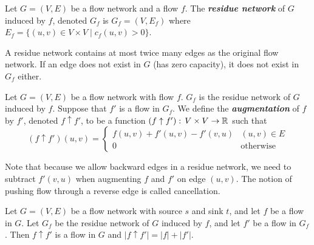 \begin{definition} 
    Let $G=(V,E)$ be a flow network and a flow $f$. The \textit{\textbf{residue network}} of $G$ induced by $f$, denoted $G_f$ is $G_f = (V,E_f)$ where $E_f = \{(u,v) \in V \times V \mid c_f(u,v) > 0 \}$.
\end{definition}
A residue network contains at most twice many edges as the original flow network. If an edge does not exist in $G$ (has zero capacity), it does not exist in $G_f$ either.

\begin{definition}[Augmentation] 
    Let $G=(V,E)$ be a flow network with flow $f$. $G_f$ is the residue network of $G$ induced by $f$. Suppose that $f'$ is a flow in $G_f$. We define the \textit{\textbf{augmentation}} of $f$ by $f'$, denoted $f \uparrow f'$, to be a function $(f \uparrow f'):\, V\times V \to \mathbb{R}$ such that
    $$
    (f \uparrow f')(u,v) = \begin{cases}
        f(u,v) + f'(u,v) - f'(v,u) & (u,v) \in E \\
        0 & \text{otherwise}
    \end{cases}
    $$
\end{definition}

Note that because we allow backward edges in a residue network, we need to subtract $f'(v,u)$ when augmenting $f$ and $f'$ on edge $(u,v)$. The notion of pushing flow through a reverse edge is called cancellation.

\begin{lemma} \label{lem:value-of-augmented-flow}
    Let $G=(V,E)$ be a flow network with source $s$ and sink $t$, and let $f$ be a flow in $G$. Let $G_f$ be the residue network of $G$ induced by $f$, and let $f'$ be a flow in $G_f$. Then $f \uparrow f'$ is a flow in $G$ and $|f \uparrow f'| = |f| + |f'|$.
\end{lemma}

